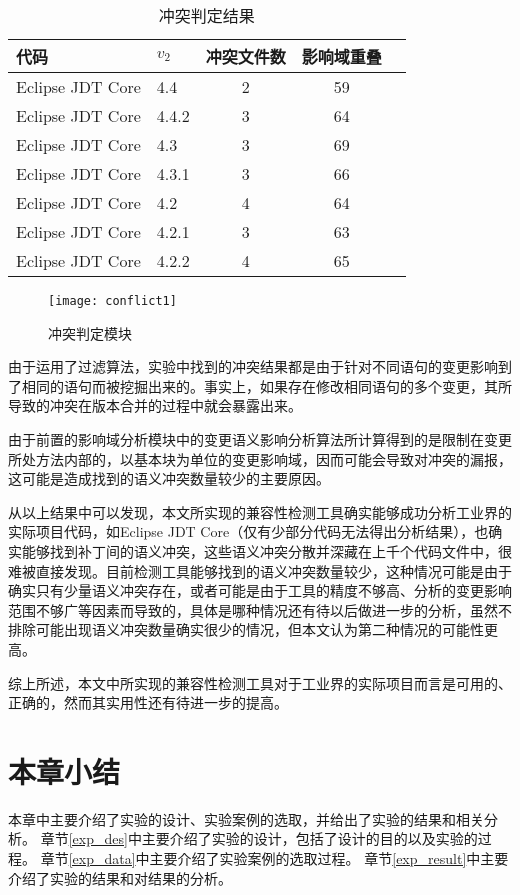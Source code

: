 \begin{table}[H]
	\caption{冲突判定结果}
	\label{data_compatible_2}
	\centering
	\begin{tabular}{llccc}
		\toprule[1.5pt]
		{\heiti 代码} & {\heiti $v_2$} & {\heiti 冲突文件数} & {\heiti 影响域重叠} \\\midrule[1pt]
		Eclipse JDT Core & 4.4 	& 2 & 59 \\
		Eclipse JDT Core & 4.4.2 & 3 & 64 \\
		Eclipse JDT Core & 4.3 	& 3 & 69 \\
		Eclipse JDT Core & 4.3.1 & 3 & 66 \\
		Eclipse JDT Core & 4.2 	& 4 & 64 \\
		Eclipse JDT Core & 4.2.1 & 3 & 63 \\
		Eclipse JDT Core & 4.2.2 & 4 & 65 \\
		\bottomrule[1.5pt]
	\end{tabular}
\end{table}

\begin{figure}[H]
	\centering
	\texttt{[image: conflict1]}
	\caption {冲突判定模块}
	\label {conflict_data}	
\end{figure}



由于运用了过滤算法，实验中找到的冲突结果都是由于针对不同语句的变更影响到了相同的语句而被挖掘出来的。事实上，如果存在修改相同语句的多个变更，其所导致的冲突在版本合并的过程中就会暴露出来。

由于前置的影响域分析模块中的变更语义影响分析算法所计算得到的是限制在变更所处方法内部的，以基本块为单位的变更影响域，因而可能会导致对冲突的漏报，这可能是造成找到的语义冲突数量较少的主要原因。

从以上结果中可以发现，本文所实现的兼容性检测工具确实能够成功分析工业界的实际项目代码，如Eclipse JDT Core（仅有少部分代码无法得出分析结果），也确实能够找到补丁间的语义冲突，这些语义冲突分散并深藏在上千个代码文件中，很难被直接发现。目前检测工具能够找到的语义冲突数量较少，这种情况可能是由于确实只有少量语义冲突存在，或者可能是由于工具的精度不够高、分析的变更影响范围不够广等因素而导致的，具体是哪种情况还有待以后做进一步的分析，虽然不排除可能出现语义冲突数量确实很少的情况，但本文认为第二种情况的可能性更高。
%		

综上所述，本文中所实现的兼容性检测工具对于工业界的实际项目而言是可用的、正确的，然而其实用性还有待进一步的提高。

\section{本章小结}
本章中主要介绍了实验的设计、实验案例的选取，并给出了实验的结果和相关分析。
章节\ref {exp_des}中主要介绍了实验的设计，包括了设计的目的以及实验的过程。
章节\ref {exp_data}中主要介绍了实验案例的选取过程。
章节\ref {exp_result}中主要介绍了实验的结果和对结果的分析。
